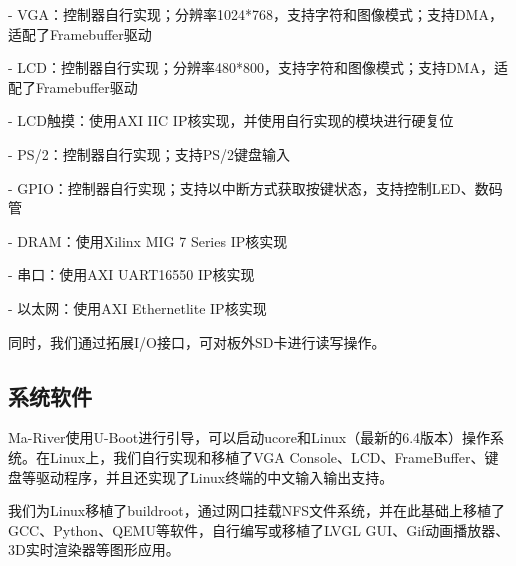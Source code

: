 - VGA：控制器自行实现；分辨率1024*768，支持字符和图像模式；支持DMA，适配了Framebuffer驱动

- LCD：控制器自行实现；分辨率480*800，支持字符和图像模式；支持DMA，适配了Framebuffer驱动

- LCD触摸：使用AXI IIC IP核实现，并使用自行实现的模块进行硬复位

- PS/2：控制器自行实现；支持PS/2键盘输入

- GPIO：控制器自行实现；支持以中断方式获取按键状态，支持控制LED、数码管

- DRAM：使用Xilinx MIG 7 Series IP核实现

- 串口：使用AXI UART16550 IP核实现

- 以太网：使用AXI Ethernetlite IP核实现

同时，我们通过拓展I/O接口，可对板外SD卡进行读写操作。


\subsection{系统软件}

Ma-River使用U-Boot进行引导，可以启动ucore和Linux（最新的6.4版本）操作系统。在Linux上，我们自行实现和移植了VGA Console、LCD、FrameBuffer、键盘等驱动程序，并且还实现了Linux终端的中文输入输出支持。

我们为Linux移植了buildroot，通过网口挂载NFS文件系统，并在此基础上移植了GCC、Python、QEMU等软件，自行编写或移植了LVGL GUI、Gif动画播放器、3D实时渲染器等图形应用。